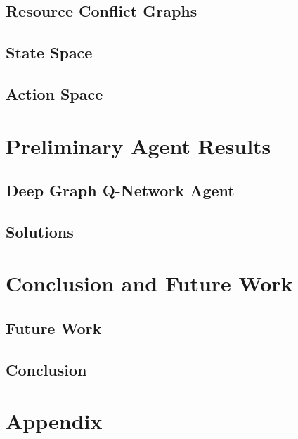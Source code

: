\documentclass[runningheads]{llncs}
\begin{document}
\subsection{Resource Conflict Graphs}
\label{sss:resource_conflicts}


\subsection{State Space}
\label{sss:state_space}

\subsection{Action Space}
\label{sss:action_space}

\section{Preliminary Agent Results}
\label{sse:results}

\subsection{Deep Graph Q-Network Agent}
\label{sss:agent}


\subsection{Solutions}
\label{sss:solutions}


\section{Conclusion and Future Work}
\label{sse:conclusion}

\subsection{Future Work}
\label{sss:future_work}

\subsection{Conclusion}
\label{sss:conclusion}


\section{Appendix}
\end{document}
